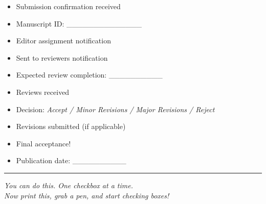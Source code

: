\documentclass[11pt]{article}
\begin{document}
\begin{itemize}[label=$\square$]
    \item Submission confirmation received
    \item Manuscript ID: \_\_\_\_\_\_\_\_\_\_\_\_\_\_
    \item Editor assignment notification
    \item Sent to reviewers notification
    \item Expected review completion: \_\_\_\_\_\_\_\_\_\_
    \item Reviews received
    \item Decision: \textit{Accept / Minor Revisions / Major Revisions / Reject}
    \item Revisions submitted (if applicable)
    \item Final acceptance!
    \item Publication date: \_\_\_\_\_\_\_\_\_\_
\end{itemize}

\vspace{2em}
\hrule
\vspace{1em}

\begin{center}
\textit{You can do this. One checkbox at a time.}\\
\vspace{0.5em}
\textit{Now print this, grab a pen, and start checking boxes!}
\end{center}
\end{document}
